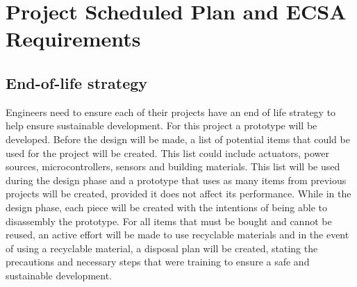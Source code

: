 \chapter{Project Scheduled Plan and ECSA Requirements }
    \section{End-of-life strategy}
        Engineers need to ensure each of their projects have an end of life strategy to help ensure sustainable development. For this project a prototype will be developed. Before the design will be made, a list of potential items that could be used for the project will be created. This list could include actuators,  power sources, microcontrollers, sensors and building materials. This list will be used during the design phase and a prototype that uses as many items from previous projects will be created, provided it does not affect its performance. While in the design phase, each piece will be created with the intentions of being able to disassembly the prototype. For all items that must be bought and cannot be reused, an active effort will be made to use recyclable materials and in the event of using a  recyclable  material, a disposal plan will be created, stating the precautions and necessary steps that were training to ensure a safe and sustainable development.
\pagebreak

